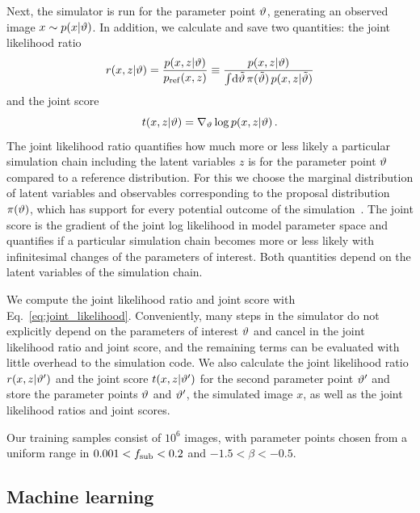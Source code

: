 \documentclass[twocolumn]{aastex62}
\begin{document}
Next, the simulator is run for the parameter point $\vartheta$, generating an observed image $x \sim p(x|\vartheta)$. In addition, we calculate and save two quantities: the joint likelihood ratio
%
\begin{equation}
  r(x,z | \stattheta) = \frac {p(x,z | \stattheta)} {p_\mathrm{ref}(x,z)}
  \equiv \frac {p(x,z | \stattheta)} {\int\!\diff\tilde{\stattheta} \, \pi(\tilde{\stattheta}) \, p(x,z | \tilde{\stattheta}) }
\end{equation}
%
and the joint score
%
\begin{equation}
  t(x, z | \stattheta) = \nabla_{\stattheta} \log p(x,z | \stattheta) \,.
\end{equation}
%
The joint likelihood ratio quantifies how much more or less likely a particular simulation chain including the latent variables $z$ is for the parameter point $\vartheta$ compared to a reference distribution. For this we choose the marginal distribution of latent variables and observables corresponding to the proposal distribution $\pi(\vartheta)$, which has support for every potential outcome of the simulation~\citep{Hermans:2019ioj}. The joint score is the gradient of the joint log likelihood in model parameter space and quantifies if a particular simulation chain becomes more or less likely with infinitesimal changes of the parameters of interest. Both quantities depend on the latent variables of the simulation chain.

We compute the joint likelihood ratio and joint score with Eq.~\eqref{eq:joint_likelihood}. Conveniently, many steps in the simulator do not explicitly depend on the parameters of interest $\vartheta$ and cancel in the joint likelihood ratio and joint score, and the remaining terms can be evaluated with little overhead to the simulation code. We also calculate the joint likelihood ratio $r(x,z|\vartheta')$ and the joint score $t(x,z|\vartheta')$ for the second parameter point $\vartheta'$ and store the parameter points $\vartheta$ and $\vartheta'$, the simulated image $x$, as well as the joint likelihood ratios and joint scores.

Our training samples consist of $10^6$ images, with parameter points chosen from a uniform range in $0.001 < f_{\mathrm{sub}} < 0.2$ and $-1.5 < \beta < -0.5$.


\subsection{Machine learning}
\label{sec:lfi-ml}
\end{document}
